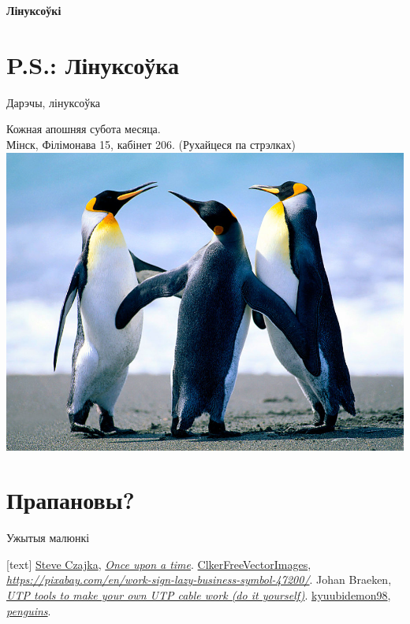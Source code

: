\documentclass[ignorenonframetext,hyperref={pdftex,unicode}]{beamer}
\begin{document}
		\item \textbf{Лінуксоўкі} 
			\pause

\section{P.S.: Лінуксоўка}
\begin{frame}{Дарэчы, лінуксоўка}
	\begin{center}
		Кожная апошняя субота месяца.\\
		Мінск, Філімонава 15, кабінет 206. (Рухайцеся па стрэлках)
		\includegraphics[width=\textwidth,height=0.8\textheight,keepaspectratio]{penguins_by_kyuubidemon98}
	\end{center}
\end{frame}

\section{Прапановы?}

\begin{frame}{Ужытыя малюнкі}
	\begin{thebibliography}{10}
	[text]
		{\sc \href{https://www.flickr.com/photos/steveczajka/}{Steve Czajka}}, {\em \href{https://www.flickr.com/photos/steveczajka/11392783794}{Once upon a time}}.
		{\sc \href{https://pixabay.com/en/users/ClkerFreeVectorImages-3736/}{ClkerFreeVectorImages}}, {\em \url{https://pixabay.com/en/work-sign-lazy-business-symbol-47200/}}.
		{\sc Johan Braeken}, {\em \href{https://commons.wikimedia.org/wiki/File:Utp_diy_tools.jpg}{UTP tools to make your own UTP cable work (do it yourself)}}.
		{\sc \href{http://kyuubidemon98.deviantart.com/}{kyuubidemon98}}, {\em \href{http://kyuubidemon98.deviantart.com/art/penguins-156283137}{penguins}}.
	\end{thebibliography}
\end{frame}
\end{document}
